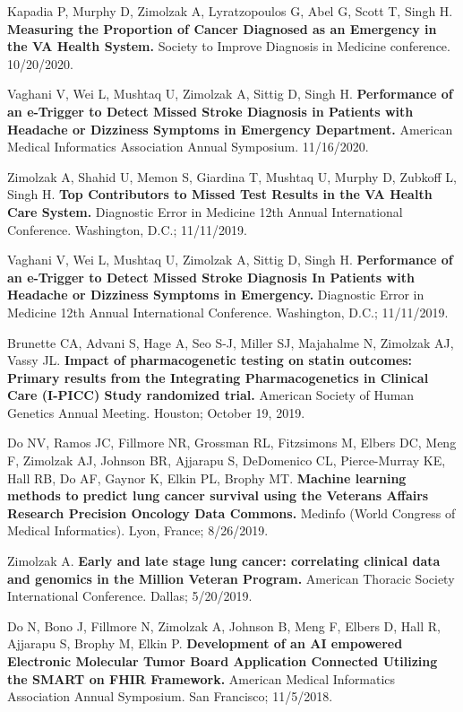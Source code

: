 \documentclass[10pt]{article}
\begin{document}
Kapadia P, Murphy D, Zimolzak A, Lyratzopoulos G, Abel G, Scott T,
Singh H. \textbf{Measuring the Proportion of Cancer Diagnosed as an
  Emergency in the VA Health System.} Society to Improve Diagnosis in
Medicine conference. 10/20/2020.


Vaghani V, Wei L, Mushtaq U, Zimolzak A, Sittig D, Singh H.
\textbf{Performance of an e-Trigger to Detect Missed Stroke Diagnosis
  in Patients with Headache or Dizziness Symptoms in Emergency
  Department.} American Medical Informatics
Association Annual Symposium. 11/16/2020.


Zimolzak A, Shahid U, Memon S, Giardina T, Mushtaq U, Murphy D,
Zubkoff L, Singh H. \textbf{Top Contributors to Missed Test Results in
  the VA Health Care System.} Diagnostic Error in Medicine 12th Annual
International Conference. Washington, D.C.; 11/11/2019.

Vaghani V, Wei L, Mushtaq U, Zimolzak A, Sittig D, Singh H.
\textbf{Performance of an e-Trigger to Detect Missed Stroke Diagnosis
  In Patients with Headache or Dizziness Symptoms in Emergency.}
Diagnostic Error in Medicine 12th Annual International Conference.
Washington, D.C.; 11/11/2019.


Brunette CA, Advani S, Hage A, Seo S-J, Miller SJ, Majahalme N,
Zimolzak AJ, Vassy JL. \textbf{Impact of pharmacogenetic testing on
  statin outcomes: Primary results from the Integrating
  Pharmacogenetics in Clinical Care (I-PICC) Study randomized trial.}
American Society of Human Genetics Annual Meeting. Houston; October
19, 2019.

Do NV, Ramos JC, Fillmore NR, Grossman RL, Fitzsimons M, Elbers DC,
Meng F, Zimolzak AJ, Johnson BR, Ajjarapu S, DeDomenico CL,
Pierce-Murray KE, Hall RB, Do AF, Gaynor K, Elkin PL, Brophy MT.
\textbf{Machine learning methods to predict lung cancer survival using
  the Veterans Affairs Research Precision Oncology Data Commons.}
Medinfo (World Congress of Medical Informatics). Lyon, France;
8/26/2019.

Zimolzak A. \textbf{Early and late stage lung cancer: correlating
  clinical data and genomics in the Million Veteran Program.} American
Thoracic Society International Conference. Dallas; 5/20/2019.

Do N, Bono J, Fillmore N, Zimolzak A, Johnson B, Meng F, Elbers D,
Hall R, Ajjarapu S, Brophy M, Elkin P. \textbf{Development of an AI
  empowered Electronic Molecular Tumor Board Application Connected
  Utilizing the SMART on FHIR Framework.} American Medical Informatics
Association Annual Symposium. San Francisco; 11/5/2018.
\end{document}
